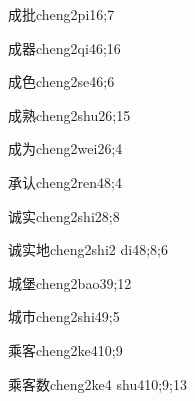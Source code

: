 \begin{verbete}{成批}{cheng2pi1}{6;7}
\end{verbete}

\begin{verbete}{成器}{cheng2qi4}{6;16}
\end{verbete}

\begin{verbete}{成色}{cheng2se4}{6;6}
\end{verbete}

\begin{verbete}{成熟}{cheng2shu2}{6;15}
\end{verbete}

\begin{verbete}{成为}{cheng2wei2}{6;4}
\end{verbete}

\begin{verbete}{承认}{cheng2ren4}{8;4}
\end{verbete}

\begin{verbete}{诚实}{cheng2shi2}{8;8}
\end{verbete}

\begin{verbete}{诚实地}{cheng2shi2 di4}{8;8;6}
\end{verbete}

\begin{verbete}{城堡}{cheng2bao3}{9;12}
\end{verbete}

\begin{verbete}{城市}{cheng2shi4}{9;5}
\end{verbete}

\begin{verbete}{乘客}{cheng2ke4}{10;9}
\end{verbete}

\begin{verbete}{乘客数}{cheng2ke4 shu4}{10;9;13}
\end{verbete}

